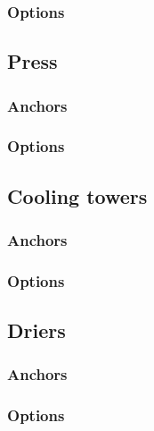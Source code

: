 \documentclass[a4paper, twoside]{article}
\begin{document}
        \subsubsection{Options}
            

    \subsection{Press}
        \subsubsection{Anchors}
            

        \subsubsection{Options}
            

    \subsection{Cooling towers}
        \subsubsection{Anchors}
            

        \subsubsection{Options}
            

    \subsection{Driers}
        \subsubsection{Anchors}
            

        \subsubsection{Options}
            
\end{document}
